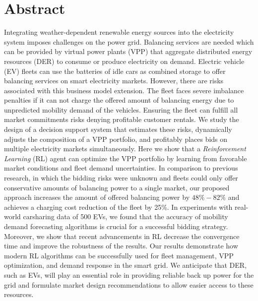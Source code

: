\thispagestyle{empty}
\vspace*{\fill} \section*{Abstract}

Integrating weather-dependent renewable energy sources into the electricity
system imposes challenges on the power grid. Balancing services are needed which
can be provided by virtual power plants (VPP) that aggregate distributed energy
resources (DER) to consume or produce electricity on demand. Electric vehicle
(EV) fleets can use the batteries of idle cars as combined storage to offer
balancing services on smart electricity markets. However, there are risks
associated with this business model extension. The fleet faces severe imbalance
penalties if it can not charge the offered amount of balancing energy due to
unpredicted mobility demand of the vehicles. Ensuring the fleet can fulfill all
market commitments risks denying profitable customer rentals. We study the
design of a decision support system that estimates these risks, dynamically
adjusts the composition of a VPP portfolio, and profitably places bids on
multiple electricity markets simultaneously. Here we show that a
\emph{Reinforcement Learning} (RL) agent can optimize the VPP portfolio by
learning from favorable market conditions and fleet demand uncertainties. In
comparison to previous research, in which the bidding risks were unknown and
fleets could only offer conservative amounts of balancing power to a single
market, our proposed approach increases the amount of offered balancing power by
$48\% - 82\%$  and achieves a charging cost reduction of the fleet by 25\%. In
experiments with real-world carsharing data of 500 EVs, we found that the
accuracy of mobility demand forecasting algorithms is crucial for a successful
bidding strategy. Moreover, we show that recent advancements in RL decrease
the convergence time and improve the robustness of the results. Our results
demonstrate how modern RL algorithms can be successfully used for fleet
management, VPP optimization, and demand response in the smart grid. We
anticipate that DER, such as EVs, will play an essential role in providing
reliable back up power for the grid and formulate market design recommendations
to allow easier access to these resources.

\vspace*{\fill}
\clearpage

